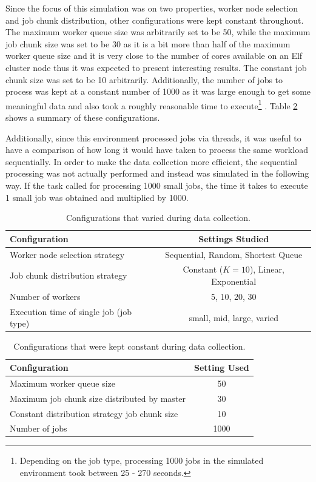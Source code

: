 \documentclass{article}
\begin{document}
Since the focus of this simulation was on two properties, worker node selection and job chunk distribution, other configurations were kept constant throughout. The maximum worker queue size was arbitrarily set to be 50, while the maximum job chunk size was set to be 30 as it is a bit more than half of the maximum worker queue size and it is very close to the number of cores available on an Elf cluster node thus it was expected to present interesting results. The constant job chunk size was set to be 10 arbitrarily. Additionally, the number of jobs to process was kept at a constant number of 1000 as it was large enough to get some meaningful data and also took a roughly reasonable time to execute\footnote{Depending on the job type, processing 1000 jobs in the simulated environment took between 25 - 270 seconds.} . Table \ref{constantConfs} shows a summary of these configurations.

Additionally, since this environment processed jobs via threads, it was useful to have a comparison of how long it would have taken to process the same workload sequentially. In order to make the data collection more efficient, the sequential processing was not actually performed and instead was simulated in the following way. If the task called for processing 1000 small jobs, the time it takes to execute 1 small job was obtained and multiplied by 1000.

\begin{table}
\centering
\begin{tabular}{|l | c | }
\hline
\textbf{Configuration} & \textbf{Settings Studied} \\
\hline
Worker node selection strategy & Sequential, Random, Shortest Queue \\
\hline
Job chunk distribution strategy & Constant ($K=10$), Linear, Exponential\\
\hline
Number of workers & 5, 10, 20, 30\\
\hline
Execution time of single job (job type) & small, mid, large, varied \\
\hline
\end{tabular}
\caption{Configurations that varied during data collection. \label{variedConfs}}
\end{table}

\begin{table}
\centering
\begin{tabular}{|l | c | }
\hline
\textbf{Configuration} & \textbf{Setting Used} \\
\hline
Maximum worker queue size & 50 \\
\hline
Maximum job chunk size distributed by master & 30\\
\hline
Constant distribution strategy job chunk size & 10\\
\hline
Number of jobs & 1000\\
\hline
\end{tabular}
\caption{Configurations that were kept constant during data collection. \label{constantConfs}}
\end{table}
\end{document}

